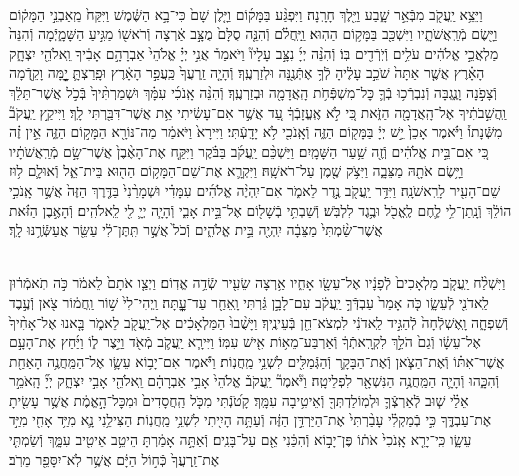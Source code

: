 \documentclass[twoside, openany, parskip=half, 11pt]{book}
\begin{document}
\begin{footnotesize}
\begin{multicols}{2}
\\
וַיֵּצֵ֥א יַֽעֲקֹ֖ב מִבְּֿאֵ֣ר שָׁ֑בַע וַיֵּ֖לֶךְ חָרָֽנָה׃ וַיִּפְגַּ֨ע בַּמָּק֜וֹם וַיָּ֤לֶן שָׁם֙ כִּי־בָ֣א הַשֶּׁ֔מֶשׁ וַיִּקַּח֙ מֵֽאַבְנֵ֣י הַמָּק֔וֹם וַיָּ֖שֶׂם מְֿרַֽאֲשֹׁתָ֑יו וַיִּשְׁכַּ֖ב בַּמָּק֥וֹם הַהֽוּא׃ וַֽיַּֽחֲלֹ֗ם וְֿהִנֵּ֤ה סֻלָּם֙ מֻצָּ֣ב אַ֔רְצָה וְֿרֹאשׁ֖וֹ מַגִּ֣יעַ הַשָּׁמָ֑יְֿמָה וְֿהִנֵּה֙ מַלְאֲכֵ֣י אֱלֹהִ֔ים עֹלִ֥ים וְֿיֹֽרְֿדִ֖ים בּֽוֹ׃  וְֿהִנֵּ֨ה יְיָ֜ נִצָּ֣ב עָלָיו֘ וַיֹּאמַר֒ אֲנִ֣י יְיָ֗ אֱלֹהֵי֙ אַבְרָהָ֣ם אָבִ֔יךָ וֵֽאלֹהֵ֖י יִצְחָ֑ק הָאָ֗רֶץ אֲשֶׁ֤ר אַתָּה֙ שֹׁכֵ֣ב עָלֶ֔יהָ לְֿךָ֥ אֶתְּֿנֶ֖נָּה וּלְזַרְעֶֽךָ׃ וְֿהָיָ֤ה זַֽרְעֲךָ֙ כַּֽעֲפַ֣ר הָאָ֔רֶץ וּפָֽרַצְתָּ֛ יׇׇׇׇׇׇָ֥מָּה וָקֵ֖דְֿמָה וְֿצָפֹ֣נָה וָנֶ֑גְבָּה וְֿנִבְרְֿכ֥וּ בְֿךָ֛ כׇּל־מִשְׁפְּֿחֹ֥ת הָֽאֲדָמָ֖ה וּבְזַרְעֶֽךָ׃ וְֿהִנֵּ֨ה אָֽנֹכִ֜י עִמָּ֗ךְ וּשְׁמַרְתִּ֨יךָ֙ בְּֿכֹ֣ל אֲשֶׁר־תֵּלֵ֔ךְ וַֽהֲשִׁ֣בֹתִ֔יךָ אֶל־הָֽאֲדָמָ֖ה הַזֹּ֑את כִּ֚י לֹ֣א אֶֽעֱזָבְֿךָ֔ עַ֚ד אֲשֶׁ֣ר אִם־עָשִׂ֔יתִי אֵ֥ת אֲשֶׁר־דִּבַּ֖רְתִּי לָֽךְ׃ וַיִּיקַ֣ץ יַֽעֲקֹב֘ מִשְּֿׁנָתוֹ֒ וַיֹּ֗אמֶר אָכֵן֙ יֵ֣שׁ יְיָ֔ בַּמָּק֖וֹם הַזֶּ֑ה וְֿאָֽנֹכִ֖י לֹ֥א יָדָֽעְֿתִּי׃ וַיִּירָא֙ וַיֹּאמַ֔ר מַה־נּוֹרָ֖א הַמָּק֣וֹם הַזֶּ֑ה אֵ֣ין זֶ֗ה כִּ֚י אִם־בֵּ֣ית אֱלֹהִ֔ים וְֿזֶ֖ה שַׁ֥עַר הַשָּׁמָֽיִם׃  וַיַּשְׁכֵּ֨ם יַֽעֲקֹ֜ב בַּבֹּ֗קֶר וַיִּקַּ֤ח אֶת־הָאֶ֨בֶן֙ אֲשֶׁר־שָׂ֣ם מְֿרַֽאֲשֹׁתָ֔יו וַיָּ֥שֶׂם אֹתָ֖הּ מַצֵּבָ֑ה וַיִּצֹ֥ק שֶׁ֖מֶן עַל־רֹאשָֽׁהּ׃ וַיִּקְרָ֛א אֶת־שֵׁם־הַמָּק֥וֹם הַה֖וּא בֵּית־אֵ֑ל וְֿאוּלָ֛ם ל֥וּז שֵׁם־הָעִ֖יר לָרִֽאשֹׁנָֽה׃ וַיִּדַּ֥ר יַֽעֲקֹ֖ב נֶ֣דֶר לֵאמֹ֑ר אִם־יִֽהְיֶ֨ה אֱלֹהִ֜ים עִמָּדִ֗י וּשְׁמָרַ֨נִי֙ בַּדֶּ֤רֶךְ הַזֶּה֙ אֲשֶׁ֣ר אָֽנֹכִ֣י הוֹלֵ֔ךְ וְֿנָֽתַן־לִ֥י לֶ֛חֶם לֶֽאֱכֹ֖ל וּבֶ֥גֶד לִלְבֹּֽשׁ׃ וְֿשַׁבְתִּ֥י בְֿשָׁל֖וֹם אֶל־בֵּ֣ית אָבִ֑י וְֿהָיָ֧ה יְיָ֛ לִ֖י לֵֽאלֹהִֽים׃ וְֿהָאֶ֣בֶן הַזֹּ֗את אֲשֶׁר־שַׂ֨מְתִּי֙ מַצֵּבָ֔ה יִֽהְיֶ֖ה בֵּ֣ית אֱלֹהִ֑ים וְֿכֹל֙ אֲשֶׁ֣ר תִּֽתֶּן־לִ֔י עַשֵּׂ֖ר אֲעַשְּֿׂרֶ֥נּוּ לָֽךְ׃

\\
וַיִּשְׁלַ֨ח יַֽעֲקֹ֤ב מַלְאָכִים֙ לְֿפָנָ֔יו אֶל־עֵשָׂ֖ו אָחִ֑יו אַ֥רְצָה שֵׂעִ֖יר שְֿׂדֵ֥ה אֱדֽוֹם׃ וַיְצַ֤ו אֹתָם֙ לֵאמֹ֔ר כֹּ֣ה תֹֽאמְֿר֔וּן לַֽאדֹנִ֖י לְֿעֵשָׂ֑ו כֹּ֤ה אָמַר֙ עַבְדְּֿךָ֣ יַֽעֲקֹ֔ב עִם־לָבָ֣ן גַּ֔רְתִּי וָֽאֵחַ֖ר עַד־עׇׇׇׇׇׇׇׇָֽתָּה׃ וַֽיְהִי־לִי֙ שׁ֣וֹר וַֽחֲמ֔וֹר צֹ֖אן וְֿעֶ֣בֶד וְֿשִׁפְחָ֑ה וָֽאֶשְׁלְֿחָה֙ לְֿהַגִּ֣יד לַֽאדֹנִ֔י לִמְצֹא־חֵ֖ן בְּֿעֵינֶֽיךָ׃  וַיָּשֻׁ֨בוּ֙ הַמַּלְאָכִ֔ים אֶל־יַֽעֲקֹ֖ב לֵאמֹ֑ר בָּ֤אנוּ אֶל־אָחִ֨יךָ֙ אֶל־עֵשָׂ֔ו וְֿגַם֙ הֹלֵ֣ךְ לִקְרָֽאתְֿךָ֔ וְֿאַרְבַּע־מֵא֥וֹת אִ֖ישׁ עִמּֽוֹ׃ וַיִּירָ֧א יַֽעֲקֹ֛ב מְֿאֹ֖ד וַיֵּ֣צֶר ל֑וֹ וַיַּ֜חַץ אֶת־הָעָ֣ם אֲשֶׁר־אִתּ֗וֹ וְֿאֶת־הַצֹּ֧אן וְֿאֶת־הַבָּקָ֛ר וְֿהַגְּֿמַלִּ֖ים לִשְׁנֵ֥י מַֽחֲנֽוֹת׃ וַיֹּ֕אמֶר אִם־יָב֥וֹא עֵשָׂ֛ו אֶל־הַמַּֽחֲנֶ֥ה הָאַחַ֖ת וְֿהִכָּ֑הוּ וְֿהָיָ֛ה הַמַּֽחֲנֶ֥ה הַנִּשְׁאָ֖ר לִפְלֵיטָֽה׃  וַיֹּ֘אמֶר֘ יַֽעֲקֹב֒ אֱלֹהֵי֙ אָבִ֣י אַבְרָהָ֔ם וֵֽאלֹהֵ֖י אָבִ֣י יִצְחָ֑ק יְיָ֞ הָֽאֹמֵ֣ר אֵלַ֗י שׁ֧וּב לְֿאַרְצְֿךָ֛ וּלְמֽוֹלַדְתְּךָ֖ וְֿאֵיטִ֥יבָה עִמָּֽךְ׃ קָטֹ֝נְֿתִּי מִכֹּ֤ל הַֽחֲסָדִים֙ וּמִכׇּל־הָ֣אֱמֶ֔ת אֲשֶׁ֥ר עָשִׂ֖יתָ אֶת־עַבְדֶּ֑ךָ כִּ֣י בְֿמַקְלִ֗י עָבַ֨רְתִּי֙ אֶת־הַיַּרְדֵּ֣ן הַזֶּ֔ה וְֿעַתָּ֥ה הָיִ֖יתִי לִשְׁנֵ֥י מַֽחֲנֽוֹת׃ הַצִּילֵ֥נִי נָ֛א מִיַּ֥ד אָחִ֖י מִיַּ֣ד עֵשָׂ֑ו כִּֽי־יָרֵ֤א אָֽנֹכִי֙ אֹת֔וֹ פֶּן־יָב֣וֹא וְֿהִכַּ֔נִי אֵ֖ם עַל־בָּנִֽים׃ וְֿאַתָּ֣ה אָמַ֔רְתָּ הֵיטֵ֥ב אֵיטִ֖יב עִמָּ֑ךְ וְֿשַׂמְתִּ֤י אֶת־זַֽרְעֲךָ֙ כְּֿח֣וֹל הַיָּ֔ם אֲשֶׁ֥ר לֹֽא־יִסָּפֵ֖ר מֵרֹֽב׃



\end{multicols}
\end{footnotesize}
\end{document}
